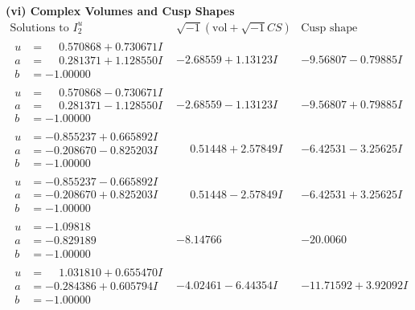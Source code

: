 \documentclass[1p]{elsarticle_modified}
\theoremstyle{definition}
\newcommand{\I}{\sqrt{-1}}
\begin{document}
\newpage\flushleft \textbf{(vi) Complex Volumes and Cusp Shapes}
$$\begin{array}{c|c|c}  
\text{Solutions to }I^u_{2}& \I (\text{vol} + \sqrt{-1}CS) & \text{Cusp shape}\\
 \hline 
\begin{aligned}
u &= \phantom{-}0.570868 + 0.730671 I \\
a &= \phantom{-}0.281371 + 1.128550 I \\
b &= -1.00000\phantom{ +0.000000I}\end{aligned}
 & -2.68559 + 1.13123 I & -9.56807 - 0.79885 I \\ \hline\begin{aligned}
u &= \phantom{-}0.570868 - 0.730671 I \\
a &= \phantom{-}0.281371 - 1.128550 I \\
b &= -1.00000\phantom{ +0.000000I}\end{aligned}
 & -2.68559 - 1.13123 I & -9.56807 + 0.79885 I \\ \hline\begin{aligned}
u &= -0.855237 + 0.665892 I \\
a &= -0.208670 - 0.825203 I \\
b &= -1.00000\phantom{ +0.000000I}\end{aligned}
 & \phantom{-}0.51448 + 2.57849 I & -6.42531 - 3.25625 I \\ \hline\begin{aligned}
u &= -0.855237 - 0.665892 I \\
a &= -0.208670 + 0.825203 I \\
b &= -1.00000\phantom{ +0.000000I}\end{aligned}
 & \phantom{-}0.51448 - 2.57849 I & -6.42531 + 3.25625 I \\ \hline\begin{aligned}
u &= -1.09818\phantom{ +0.000000I} \\
a &= -0.829189\phantom{ +0.000000I} \\
b &= -1.00000\phantom{ +0.000000I}\end{aligned}
 & -8.14766\phantom{ +0.000000I} & -20.0060\phantom{ +0.000000I} \\ \hline\begin{aligned}
u &= \phantom{-}1.031810 + 0.655470 I \\
a &= -0.284386 + 0.605794 I \\
b &= -1.00000\phantom{ +0.000000I}\end{aligned}
 & -4.02461 - 6.44354 I & -11.71592 + 3.92092 I \\ \hline\begin{aligned}

\end{aligned}
\end{array}$$
\end{document}
